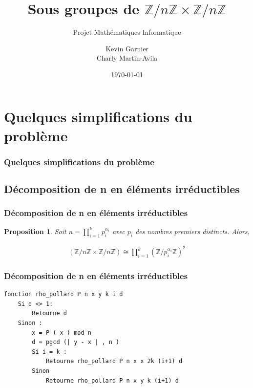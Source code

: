 \documentclass{beamer}
\title{
    Sous groupes de $\mathbb{Z}/n \mathbb{Z} \times \mathbb{Z}/n\mathbb{Z}$
}
\subtitle{Projet Mathématiques-Informatique}
\institute[U. Paris Cité]{Université Paris Cité}
\author[Kevin G., Charly M.A.]{
    Kevin Garnier \\    Charly Martin-Avila
}
\date{\today}
\newtheorem{prp}{Proposition}
\begin{document}
\begin{frame}
\titlepage
\end{frame}

\tableofcontents


\section{Quelques simplifications du problème}
\begin{frame}
\frametitle{Quelques simplifications du problème}
\tableofcontents[currentsection]
\end{frame}


\subsection{Décomposition de n en éléments irréductibles}
\begin{frame}
    \frametitle{Décomposition de n en éléments irréductibles}
    \begin{prp}
        Soit $n = \prod\limits_{i = 1}^k p_i^{\alpha_i}$ avec $p_i$ des nombres premiers distincts. Alors,
    
        \begin{align*}
            (\mathbb{Z}/n\mathbb{Z} \times \mathbb{Z}/n\mathbb{Z})
            \cong
            \prod\limits_{i = 1}^k (\mathbb{Z}/p_i^{\alpha_i}\mathbb{Z})^{2}
        \end{align*}
    \end{prp}
\end{frame}


\begin{frame}[fragile]
    \frametitle{Décomposition de n en éléments irréductibles}
    \begin{verbatim}
fonction rho_pollard P n x y k i d
    Si d <> 1:
        Retourne d
    Sinon :
        x = P ( x ) mod n
        d = pgcd (| y - x | , n )
        Si i = k :
            Retourne rho_pollard P n x x 2k (i+1) d
        Sinon 
            Retourne rho_pollard P n x y k (i+1) d
    \end{verbatim}
\end{frame}
\end{document}
